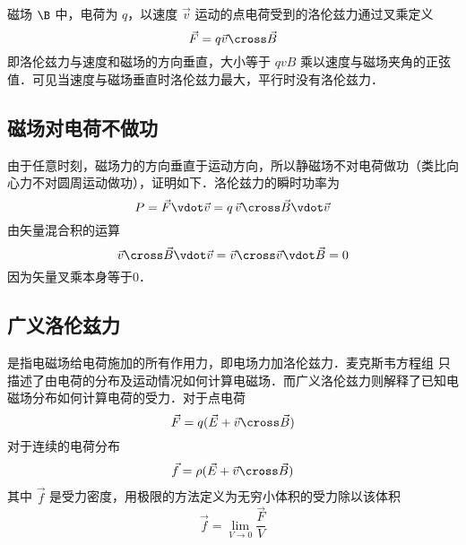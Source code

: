 
磁场 $\B$ 中，电荷为 $q$，以速度 $\vec v$ 运动的点电荷受到的洛伦兹力通过叉乘定义
\begin{equation}
\vec F = q\vec v \cross \vec B
\end{equation}
即洛伦兹力与速度和磁场的方向垂直，大小等于 $qvB$ 乘以速度与磁场夹角的正弦值．可见当速度与磁场垂直时洛伦兹力最大，平行时没有洛伦兹力．

\subsection{磁场对电荷不做功}
由于任意时刻，磁场力的方向垂直于运动方向，所以静磁场不对电荷做功（类比向心力不对圆周运动做功），证明如下．洛伦兹力的瞬时功率为
\begin{equation}
P = \vec F \vdot \vec v = q\,\vec v \cross \vec B \vdot \vec v
\end{equation}
由矢量混合积的运算 %
\begin{equation}
\vec v \cross \vec B \vdot \vec v = \vec v \cross \vec v \vdot \vec B = 0
\end{equation}
因为矢量叉乘本身等于0．


\subsection{广义洛伦兹力}
 是指电磁场给电荷施加的所有作用力，即电场力加洛伦兹力．麦克斯韦方程组%
只描述了由电荷的分布及运动情况如何计算电磁场．而广义洛伦兹力则解释了已知电磁场分布如何计算电荷的受力．对于点电荷
\begin{equation}
\vec F = q ( {\vec E + \vec v \cross \vec B})
\end{equation}
对于连续的电荷分布
\begin{equation}
\vec f = \rho ({\vec E + \vec v \cross \vec B})
\end{equation}
其中 $\vec f$ 是受力密度，用极限的方法定义为无穷小体积的受力除以该体积
\begin{equation}
\vec f = \lim_{V \to 0} \frac{\vec F}{V}
\end{equation}

